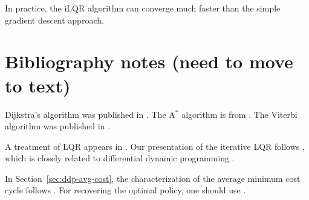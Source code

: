 In practice, the iLQR algorithm can converge much faster than the simple gradient descent approach.



% 
% 
% 

%


\section{Bibliography notes (need to move to text)}

Dijkstra's algorithm was published in \cite{dijkstra1959note}. The A$^*$ algorithm is from \cite{hart1968formal}. The Viterbi algorithm was published in \cite{viterbi1967error}. 

A treatment of LQR appears in \cite{khalil1996robust}. Our presentation of the iterative LQR follows \cite{todorov2005generalized}, which is closely related to differential dynamic programming \cite{JacobsonMayne1970}.

In Section~\ref{sec:ddp-avg-cost}, the characterization of the average minimum cost cycle follows \cite{Karp78}. For recovering the optimal policy, one should use \cite{ChaturvediM17}.

